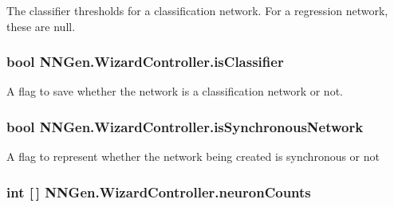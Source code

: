 The classifier thresholds for a classification network. For a regression network, these are null. 

\hypertarget{class_n_n_gen_1_1_wizard_controller_a9314043770a6c63e71dadc2c3abaf63a}{}
\subsubsection[{is\+Classifier}]{\setlength{\rightskip}{0pt plus 5cm}bool N\+N\+Gen.\+Wizard\+Controller.\+is\+Classifier\hspace{0.3cm}{\ttfamily [get]}}\label{class_n_n_gen_1_1_wizard_controller_a9314043770a6c63e71dadc2c3abaf63a}


A flag to save whether the network is a classification network or not. 

\hypertarget{class_n_n_gen_1_1_wizard_controller_aa3186397159e779da8e2007b9f1c2884}{}
\subsubsection[{is\+Synchronous\+Network}]{\setlength{\rightskip}{0pt plus 5cm}bool N\+N\+Gen.\+Wizard\+Controller.\+is\+Synchronous\+Network\hspace{0.3cm}{\ttfamily [get]}}\label{class_n_n_gen_1_1_wizard_controller_aa3186397159e779da8e2007b9f1c2884}


A flag to represent whether the network being created is synchronous or not 

\hypertarget{class_n_n_gen_1_1_wizard_controller_ad5eb425198c744f28f5e228eeffc895b}{}
\subsubsection[{neuron\+Counts}]{\setlength{\rightskip}{0pt plus 5cm}int \mbox{[}$\,$\mbox{]} N\+N\+Gen.\+Wizard\+Controller.\+neuron\+Counts\hspace{0.3cm}{\ttfamily [get]}}\label{class_n_n_gen_1_1_wizard_controller_ad5eb425198c744f28f5e228eeffc895b}


